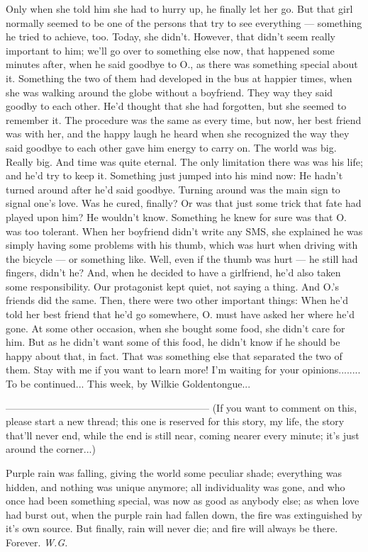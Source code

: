Only when she told him she had to hurry up, he finally let her go. 
But that girl normally seemed to be one of the persons that try to see everything --- something he tried to achieve, too. 
Today, she didn't. 
However, that didn't seem really important to him; we'll go over to something else now, that happened some minutes after, when he said goodbye to O., as there was something special about it. 
Something the two of them had developed in the bus at happier times, when she was walking around the globe without a boyfriend. 
They way they said goodby to each other. 
He'd thought that she had forgotten, but she seemed to remember it. 
The procedure was the same as every time, but now, her best friend was with her, and the happy laugh he heard when she recognized the way they said goodbye to each other gave him energy to carry on. 
The world was big. 
Really big. 
And time was quite eternal. 
The only limitation there was was his life; and he'd try to keep it. 
Something just jumped into his mind now: He hadn't turned around after he'd said goodbye. 
Turning around was the main sign to signal one's love. 
Was he cured, finally?
Or was that just some trick that fate had played upon him?
He wouldn't know. 
Something he knew for sure was that O. was too tolerant. 
When her boyfriend didn't write any SMS, she explained he was simply having some problems with his thumb, which was hurt when driving with the bicycle --- or something like. 
Well, even if the thumb was hurt --- he still had fingers, didn't he?
And, when he decided to have a girlfriend, he'd also taken some responsibility. 
Our protagonist kept quiet, not saying a thing. 
And O.'s friends did the same. 
Then, there were two other important things: When he'd told her best friend that he'd go somewhere, O. must have asked her where he'd gone. 
At some other occasion, when she bought some food, she didn't care for him. 
But as he didn't want some of this food, he didn't know if he should be happy about that, in fact. 
That was something else that separated the two of them. 
Stay with me if you want to learn more!
I'm waiting for your opinions........
To be continued...
This week, by Wilkie Goldentongue...

--------------------------------------------------------------
(If you want to comment on this, please start a new thread; this one is reserved for this story, my life, the story that'll never end, while the end is still near, coming nearer every minute; it's just around the corner...)

Purple rain was falling, 
giving the world some peculiar shade; 
everything was hidden, 
and nothing was unique anymore; 
all individuality was gone, 
and who once had been something special, 
was now as good as anybody else;
as when love had burst out, 
when the purple rain had fallen down, 
the fire was extinguished 
by it's own source. 
But finally, rain will never die; 
and fire will always be there. 
Forever. 
\emph{W.G.}

